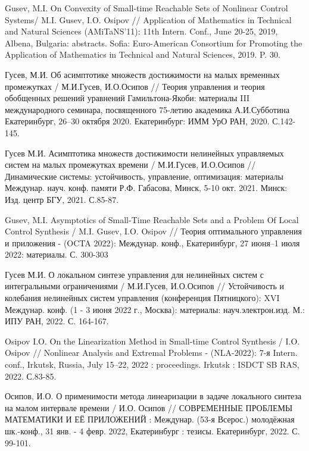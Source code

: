 \documentclass[../main.tex]{subfiles}
\begin{document}
\begin{thebibliography}{99}
   Gusev, M.I. On Convexity of Small-time Reachable Sets of Nonlinear Control Systems/ M.I. Gusev, I.O. Osipov // Application of Mathematics in Technical and Natural Sciences (AMiTaNS’11): 11th Intern. Conf., June 20-25, 2019, Albena, Bulgaria: abstracts. Sofia: Euro-American Consortium for Promoting the Application of Mathematics in Technical and Natural Sciences, 2019. P. 30. 
    
    Гусев, М.И. 
    Об асимптотике множеств достижимости на малых временных промежутках / 
    М.И.Гусев, И.О.Осипов // 
    Теория управления и теория обобщенных решений уравнений Гамильтона-Якоби: материалы III международного семинара, посвященного 75-летию академика А.И.Субботина 
    Екатеринбург, 26–30 октября 2020. 
    Екатеринбург: ИММ УрО РАН, 2020. С.142-145.


    Гусев М.И. Асимптотика множеств достижимости нелинейных управляемых систем на малых промежутках времени / М.И.Гусев, И.О.Осипов // Динамические системы: устойчивость, управление, оптимизация: материалы Междунар. науч. конф. памяти Р.Ф. Габасова, Минск, 5-10 окт. 2021. Минск: Изд. центр БГУ, 2021. С.85-87. 

    Gusev, M.I. 
    Asymptotics of Small-Time Reachable Sets and a Problem Of Local Control Synthesis / 
    M.I. Gusev, I.O. Osipov // 
    Теория оптимального управления и приложения - (OCTA 2022): 
    Междунар. конф., Екатеринбург, 27 июня–1 июля 2022: 
    материалы. С. 300-303
    
    Гусев М.И. О локальном синтезе управления для нелинейных систем с интегральными ограничениями / М.И.Гусев, И.О.Осипов // Устойчивость и колебания нелинейных систем управления (конференция Пятницкого): XVI Междунар. конф. (1 - 3 июня 2022 г., Москва): материалы: науч.электрон.изд. М.: ИПУ РАН, 2022. С. 164-167.
    
    Osipov I.O. On the Linearization Method in Small-time Control Synthesis / I.O. Osipov // Nonlinear Analysis and Extremal Problems - (NLA-2022): 7-я Intern. conf., Irkutsk, Russia, July 15–22, 2022 : proceedings. Irkutsk : ISDCT SB RAS, 2022. С.83-85.
    
    Осипов, И.О. О применимости метода линеаризации в задаче локального синтеза на малом интервале времени / И.О. Осипов // СОВРЕМЕННЫЕ ПРОБЛЕМЫ МАТЕМАТИКИ И ЕЁ ПРИЛОЖЕНИЙ : Междунар. (53-я Всерос.) молодёжная шк.-конф., 31 янв. - 4 февр. 2022, Екатеринбург : тезисы. Екатеринбург, 2022. С. 99-101.
    

\end{thebibliography}
\end{document}
